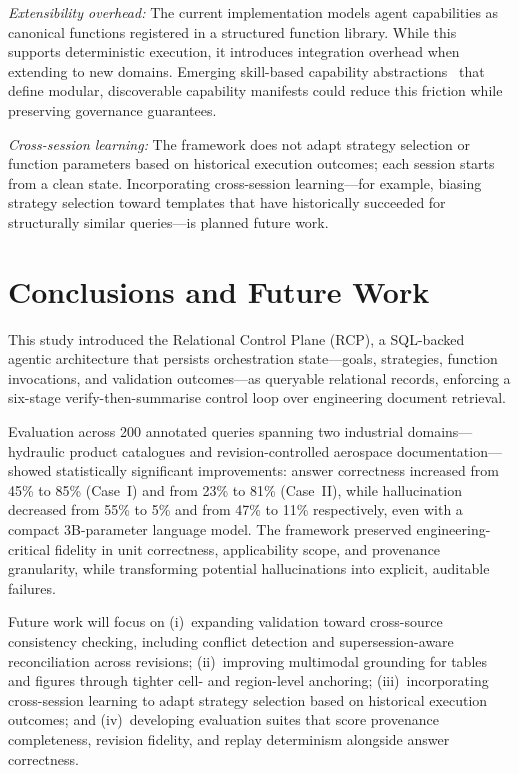 \documentclass[largeformat]{interact}
\begin{document}
    \noindent \textit{Extensibility overhead:} The current implementation models agent capabilities as canonical functions registered in a structured function library. While this supports deterministic execution, it introduces integration overhead when extending to new domains. Emerging skill-based capability abstractions~\cite{agentskills2024} that define modular, discoverable capability manifests could reduce this friction while preserving governance guarantees.
\vspace{0.5em}

    \noindent \textit{Cross-session learning:} The framework does not adapt strategy selection or function parameters based on historical execution outcomes; each session starts from a clean state. Incorporating cross-session learning---for example, biasing strategy selection toward templates that have historically succeeded for structurally similar queries---is planned future work.


\section{Conclusions and Future Work}
\label{sec:conclusions_and_future_work}
This study introduced the Relational Control Plane (RCP), a SQL-backed agentic architecture that persists orchestration state---goals, strategies, function invocations, and validation outcomes---as queryable relational records, enforcing a six-stage verify-then-summarise control loop over engineering document retrieval.

Evaluation across 200 annotated queries spanning two industrial domains---hydraulic product catalogues and revision-controlled aerospace documentation---showed statistically significant improvements: answer correctness increased from 45\% to 85\% (Case~I) and from 23\% to 81\% (Case~II), while hallucination decreased from 55\% to 5\% and from 47\% to 11\% respectively, even with a compact 3B-parameter language model. The framework preserved engineering-critical fidelity in unit correctness, applicability scope, and provenance granularity, while transforming potential hallucinations into explicit, auditable failures.

Future work will focus on (i)~expanding validation toward cross-source consistency checking, including conflict detection and supersession-aware reconciliation across revisions; (ii)~improving multimodal grounding for tables and figures through tighter cell- and region-level anchoring; (iii)~incorporating cross-session learning to adapt strategy selection based on historical execution outcomes; and (iv)~developing evaluation suites that score provenance completeness, revision fidelity, and replay determinism alongside answer correctness.
\end{document}
